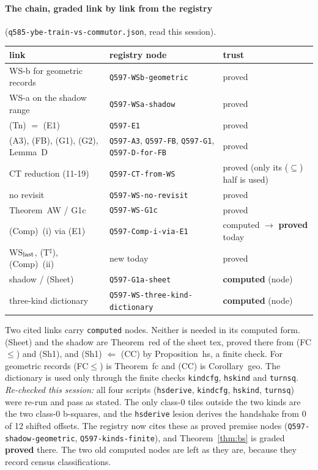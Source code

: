 \documentclass[11pt]{article}
\theoremstyle{definition}\newtheorem{definition}[theorem]{Definition}\newtheorem{remark}[theorem]{Remark}
\begin{document}
\paragraph{The chain, graded link by link from the registry} (\texttt{q585-ybe-train-vs-commutor.json}, read this session).
\begin{center}\small\begin{tabular}{lll}\toprule
link & registry node & trust\\\midrule
WS-b for geometric records & \texttt{Q597-WSb-geometric} & proved\\
WS-a on the shadow range & \texttt{Q597-WSa-shadow} & proved\\
(Tn) $=$ (E1) & \texttt{Q597-E1} & proved\\
(A3), (FB), (G1), (G2), Lemma~D & \texttt{Q597-A3}, \texttt{Q597-FB}, \texttt{Q597-G1}, \texttt{Q597-D-for-FB} & proved\\
CT reduction (11-19) & \texttt{Q597-CT-from-WS} & proved (only its ($\subseteq$) half is used)\\
no revisit & \texttt{Q597-WS-no-revisit} & proved\\
Theorem~AW / G1c & \texttt{Q597-WS-G1c} & proved\\
(Comp)~(i) via (E1) & \texttt{Q597-Comp-i-via-E1} & computed $\to$ \textbf{proved} today\\
WS$_{\rm last}$, (T$^\sharp$), (Comp)~(ii) & new today & proved\\
shadow / (Sheet) & \texttt{Q597-G1a-sheet} & \textbf{computed} (node)\\
three-kind dictionary & \texttt{Q597-WS-three-kind-dictionary} & \textbf{computed} (node)\\\bottomrule
\end{tabular}\end{center}
Two cited links carry \texttt{computed} nodes. Neither is needed in its computed form. (Sheet) and the shadow are Theorem~red of the sheet tex, proved there from (FC$\le$) and (Sh1), and (Sh1) $\Leftarrow$ (CC) by Proposition~hs, a finite check. For geometric records (FC$\le$) is Theorem~fc and (CC) is Corollary~geo. The dictionary is used only through the finite checks \texttt{kindcfg}, \texttt{hskind} and \texttt{turnsq}. \emph{Re-checked this session:} all four scripts (\texttt{hsderive}, \texttt{kindcfg}, \texttt{hskind}, \texttt{turnsq}) were re-run and pass as stated. The only class-0 tiles outside the two kinds are the two class-0 b-squares, and the \texttt{hsderive} lesion derives the handshake from 0 of 12 shifted offsets. The registry now cites these as proved premise nodes (\texttt{Q597-shadow-geometric}, \texttt{Q597-kinds-finite}), and Theorem~\ref{thm:bs} is graded \textbf{proved} there. The two old computed nodes are left as they are, because they record census classifications.
\end{document}
